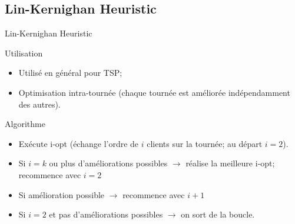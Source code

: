 \documentclass{beamer}
\begin{document}
\subsection{Lin-Kernighan Heuristic}
\begin{frame}{Lin-Kernighan Heuristic}

\begin{block}{Utilisation}
\begin{itemize}
\item Utilisé en général pour TSP;
\item Optimisation intra-tournée (chaque tournée est améliorée indépendamment des autres).
\end{itemize}
\end{block}

\begin{exampleblock}{Algorithme}
\begin{itemize}
\item Exécute i-opt (échange l'ordre de $i$ clients sur la tournée; au départ $i=2$).
\item Si $i=k$ ou plus d'améliorations possibles $\rightarrow$ réalise la meilleure i-opt; recommence avec $i=2$
\item Si amélioration possible $\rightarrow$ recommence avec $i+1$
\item Si $i=2$ et pas d'améliorations possibles $\rightarrow$ on sort de la boucle.
\end{itemize}
\end{exampleblock}

\end{frame} 
\end{document}
